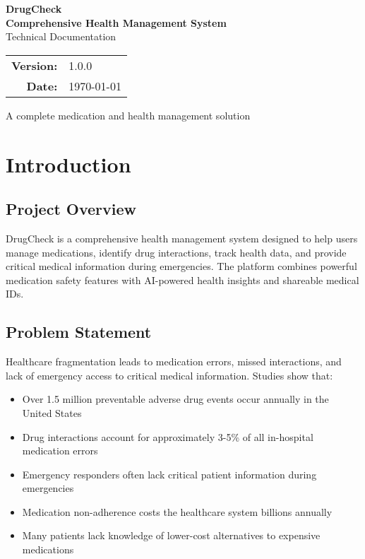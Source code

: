 \documentclass[12pt,a4paper]{report}
\begin{document}
\begin{titlepage}
\centering
{\Huge\bfseries DrugCheck\\}
\vspace{1.5cm}
{\Large\bfseries Comprehensive Health Management System\\}
\vspace{1.5cm}
{\large Technical Documentation}
\vspace{3cm}

\begin{tabular}{rl}
\Large\textbf{Version:} & \Large 1.0.0 \\
\Large\textbf{Date:} & \Large \today \\
\end{tabular}

\vfill

{\large A complete medication and health management solution}

\end{titlepage}

\tableofcontents

\chapter{Introduction}

\section{Project Overview}
DrugCheck is a comprehensive health management system designed to help users manage medications, identify drug interactions, track health data, and provide critical medical information during emergencies. The platform combines powerful medication safety features with AI-powered health insights and shareable medical IDs.

\section{Problem Statement}
Healthcare fragmentation leads to medication errors, missed interactions, and lack of emergency access to critical medical information. Studies show that:
\begin{itemize}
    \item Over 1.5 million preventable adverse drug events occur annually in the United States
    \item Drug interactions account for approximately 3-5\% of all in-hospital medication errors
    \item Emergency responders often lack critical patient information during emergencies
    \item Medication non-adherence costs the healthcare system billions annually
    \item Many patients lack knowledge of lower-cost alternatives to expensive medications
\end{itemize}
\end{document}
